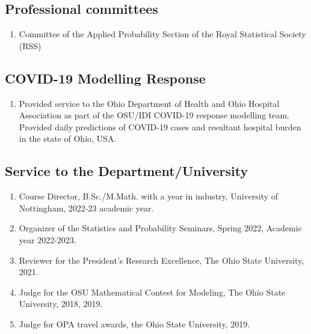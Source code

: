 \documentclass[11pt,a4paper,sans]{moderncv}        %
\begin{document}
\subsection{Professional committees}
\begin{enumerate}
	\item Committee of the Applied Probability Section of the Royal Statistical Society (RSS)
\end{enumerate}

\subsection{COVID-19 Modelling Response}
\begin{enumerate}
	\item Provided service to the Ohio Department of Health and Ohio Hospital Association as part of the OSU/IDI COVID-19 response modelling team. Provided daily predictions of COVID-19 cases and resultant hospital burden in the state of Ohio, USA. 
\end{enumerate}

\subsection{Service to the Department/University}
\begin{enumerate}
	\item Course Director, B.Sc./M.Math. with a year in industry, University of Nottingham, 2022-23 academic year. 
	\item Organizer of the Statistics and Probability Seminars, Spring 2022, Academic year 2022-2023.
	\item Reviewer for the President’s Research Excellence, The Ohio State University, 2021.
	\item {Judge for the OSU Mathematical Contest for Modeling, The Ohio State University,  2018, 2019}.
	\item {Judge for OPA travel awards, the Ohio State University, 2019}.
\end{enumerate}
\end{document}
